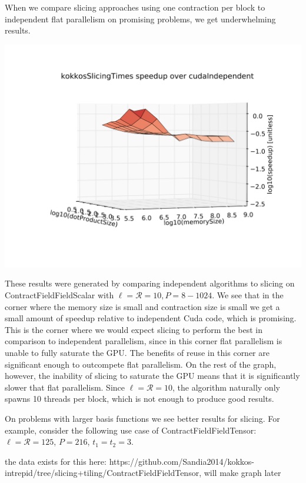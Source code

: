 When we compare slicing approaches using one contraction per block to independent flat parallelism on promising problems, we get underwhelming results. 

    \includegraphics[scale = .17]{slicingvsindependent}

These results were generated by comparing independent algorithms to slicing on ContractFieldFieldScalar with $\ell = \mathcal{R} = 10, P = 8 - 1024$. We see that in the corner where the memory size is small and contraction size is small we get a small amount of speedup relative to independent Cuda code, which is promising. This is the corner where we would expect slicing to perform the best in comparison to independent parallelism, since in this corner flat parallelism is unable to fully saturate the GPU. The benefits of reuse in this corner are significant enough to outcompete flat parallelism. On the rest of the graph, however, the inability of slicing to saturate the GPU means that it is significantly slower that flat parallelism. Since $\ell = \mathcal{R} = 10$, the algorithm naturally only spawns 10 threads per block, which is not enough to produce good results. 

On problems with larger basis functions we see better results for slicing. For example, consider the following use case of ContractFieldFieldTensor: $\ell = \mathcal{R} = 125$, $P = 216$, $t_1 = t_2 = 3$.

\vspace{10mm}
the data exists for this here: https://github.com/Sandia2014/kokkos-intrepid/tree/slicing+tiling/ContractFieldFieldTensor, will make graph later


